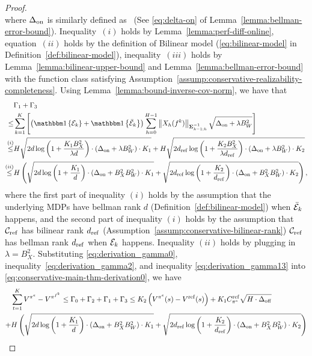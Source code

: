 \begin{proof}
\begin{equation}
\end{equation}
where $\Delta_\mathrm{on}$ is similarly defined as~\citet{song2023hybrid} (See \eqref{eq:delta-on} of Lemma~\ref{lemma:bellman-error-bound}). Inequality~$(i)$ holds by Lemma~\ref{lemma:perf-diff-online}, equation~$(ii)$ holds by the definition of Bilinear model (\eqref{eq:bilinear-model} in Definition~\ref{def:bilinear-model}), inequality~$(iii)$ holds by Lemma~\ref{lemma:bilinear-upper-bound} and Lemma~\ref{lemma:bellman-error-bound} with the function class satisfying Assumption~\ref{assump:conservative-realizability-completeness}. Using Lemma~\ref{lemma:bound-inverse-cov-norm}, we have that 
{\small
\begin{equation}
    \label{eq:derivation_gamma13}
    \begin{split}
        &\Gamma_1+\Gamma_3\\
        \leq&\sum_{k=1}^K\brac{\paren{\indicator{\mc E_k}+\indicator{\bar{\mc E}_k}}\sum_{h=0}^{H-1}\norm{X_h(f^k)}{\mb \Sigma^{-1}_{k-1;h}}\sqrt{\Deltaon+\lambda B_W^2}}\\
        \overset{(i)}{\leq} &H\sqrt{2d\log\paren{1+\frac{K_1B_X^2}{\lambda d}}\cdot(\Deltaon+\lambda B_W^2)\cdot K_1}+H\sqrt{2d_\mr{ref}\log\paren{1+\frac{K_2B_X^2}{\lambda d_\mr{ref}}}\cdot(\Deltaon+\lambda B_W^2)\cdot K_2}\\
        \overset{(ii)}{\leq} &H\paren{\sqrt{2d\log\paren{1+\frac{K_1}{ d}}\cdot(\Deltaon+B_X^2 B_W^2)\cdot K_1}+\sqrt{2d_\mr{ref}\log\paren{1+\frac{K_2}{d_\mr{ref}}}\cdot(\Deltaon+B_X^2 B_W^2)\cdot K_2}},
    \end{split}
\end{equation}
}
where the first part of inequality $(i)$ holds by the assumption that the underlying MDPs have bellman rank $d$ (Definition~\ref{def:bilinear-model}) when $\bar{\mathcal E}_k$ happens, and the second part of inequality $(i)$ holds by the assumption 
that $\mathcal C_\mathrm{ref}$ has bilinear rank $d_\mathrm{ref}$ (Assumption~\ref{assump:conservative-bilinear-rank}) $\mathcal C_\mathrm{ref}$ has bellman rank $d_\mathrm{ref}$ when $\mathcal E_k$ happens. Inequality $(ii)$ holds by plugging in $\lambda = B_X^2$. Substituting \eqref{eq:derivation_gamma0}, inequality~\ref{eq:derivation_gamma2}, and inequality \eqref{eq:derivation_gamma13} into \eqref{eq:conservative-main-thm-derivation0}, we have 
{\small
\begin{equation}
    \begin{split}
        &\sum_{t=1}^K V^{\pi^e}-V^{\pi^{f^k}}\leq \Gamma_0 + \Gamma_2 + \Gamma_1 + \Gamma_3 \leq K_2\left( V^{\pi^e}(s)-V^{\mathrm{ref}}(s) \right) + K_1C_{\pi^e}^\mathrm{ref}\sqrt{H\cdot \Delta_\mathrm{off}}\\
        +& H\left( \sqrt{2d\log\left( 1+\frac{K_1}{ d} \right)\cdot(\Delta_\mathrm{on}+B_X^2 B_W^2)\cdot K_1}+\sqrt{2d_\mathrm{ref}\log\left( 1+\frac{K_2}{d_\mathrm{ref}} \right)\cdot(\Delta_\mathrm{on}+B_X^2 B_W^2)\cdot K_2} \right)
    \end{split}
\end{equation}
}


\end{proof}

